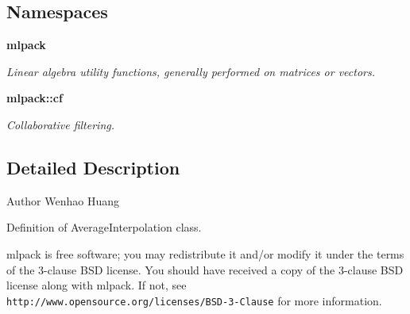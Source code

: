 \subsection*{Namespaces}
\begin{DoxyCompactItemize}
\item 
 \textbf{ mlpack}
\begin{DoxyCompactList}\small\item\em Linear algebra utility functions, generally performed on matrices or vectors. \end{DoxyCompactList}\item 
 \textbf{ mlpack\+::cf}
\begin{DoxyCompactList}\small\item\em Collaborative filtering. \end{DoxyCompactList}\end{DoxyCompactItemize}


\subsection{Detailed Description}
\begin{DoxyAuthor}{Author}
Wenhao Huang
\end{DoxyAuthor}
Definition of Average\+Interpolation class.

mlpack is free software; you may redistribute it and/or modify it under the terms of the 3-\/clause B\+SD license. You should have received a copy of the 3-\/clause B\+SD license along with mlpack. If not, see {\tt http\+://www.\+opensource.\+org/licenses/\+B\+S\+D-\/3-\/\+Clause} for more information. 